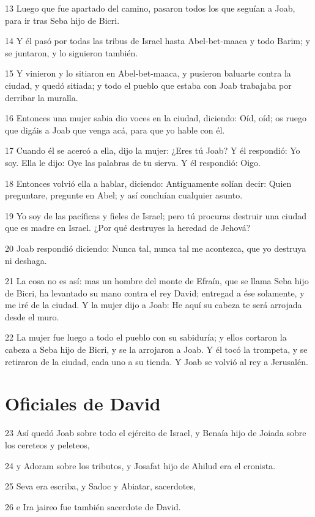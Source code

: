 \par 13 Luego que fue apartado del camino, pasaron todos los que seguían a Joab, para ir tras Seba hijo de Bicri.
\par 14 Y él pasó por todas las tribus de Israel hasta Abel-bet-maaca y todo Barim; y se juntaron, y lo siguieron también.
\par 15 Y vinieron y lo sitiaron en Abel-bet-maaca, y pusieron baluarte contra la ciudad, y quedó sitiada; y todo el pueblo que estaba con Joab trabajaba por derribar la muralla.
\par 16 Entonces una mujer sabia dio voces en la ciudad, diciendo: Oíd, oíd; os ruego que digáis a Joab que venga acá, para que yo hable con él.
\par 17 Cuando él se acercó a ella, dijo la mujer: ¿Eres tú Joab? Y él respondió: Yo soy. Ella le dijo: Oye las palabras de tu sierva. Y él respondió: Oigo.
\par 18 Entonces volvió ella a hablar, diciendo: Antiguamente solían decir: Quien preguntare, pregunte en Abel; y así concluían cualquier asunto.
\par 19 Yo soy de las pacíficas y fieles de Israel; pero tú procuras destruir una ciudad que es madre en Israel. ¿Por qué destruyes la heredad de Jehová?
\par 20 Joab respondió diciendo: Nunca tal, nunca tal me acontezca, que yo destruya ni deshaga.
\par 21 La cosa no es así: mas un hombre del monte de Efraín, que se llama Seba hijo de Bicri, ha levantado su mano contra el rey David; entregad a ése solamente, y me iré de la ciudad. Y la mujer dijo a Joab: He aquí su cabeza te será arrojada desde el muro.
\par 22 La mujer fue luego a todo el pueblo con su sabiduría; y ellos cortaron la cabeza a Seba hijo de Bicri, y se la arrojaron a Joab. Y él tocó la trompeta, y se retiraron de la ciudad, cada uno a su tienda. Y Joab se volvió al rey a Jerusalén.

\section*{Oficiales de David }

\par 23 Así quedó Joab sobre todo el ejército de Israel, y Benaía hijo de Joiada sobre los cereteos y peleteos,
\par 24 y Adoram sobre los tributos, y Josafat hijo de Ahilud era el cronista.
\par 25 Seva era escriba, y Sadoc y Abiatar, sacerdotes,
\par 26 e Ira jaireo fue también sacerdote de David.

